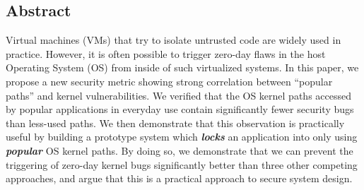 \subsection*{Abstract}

%
%

%
%

Virtual machines (VMs) that try to isolate untrusted code are widely used in practice. 
However, it is often possible to trigger zero-day flaws
in the host Operating System (OS) from inside of such virtualized systems.
%
In this paper, we propose a new security metric showing strong correlation between ``popular paths'' 
and kernel vulnerabilities. We verified that the OS kernel paths accessed 
by popular applications in everyday use contain significantly fewer security bugs than less-used paths.  We then demonstrate that this observation is
practically useful by building a prototype system which \textbf{\textit{locks}} an
application into only using \textbf{\textit{popular}} OS kernel paths.  By doing so, we
demonstrate that
we can prevent the triggering of zero-day kernel bugs
significantly better than three other competing approaches, and argue that
this is a practical approach to  secure system design.
